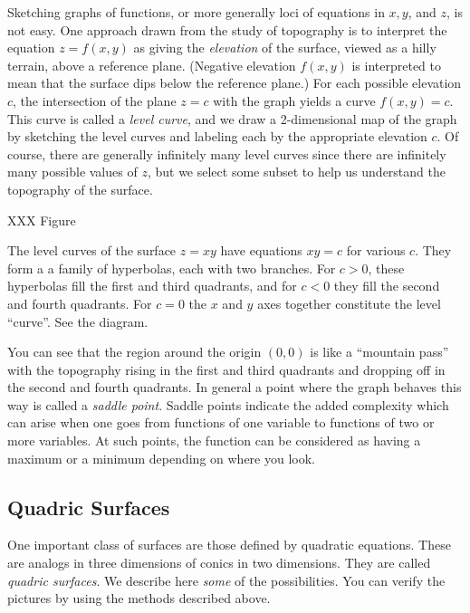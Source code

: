Sketching graphs of functions, or more generally loci of equations
in $x, y$, and $z$, is not easy.   One approach drawn from the
study of topography is to interpret the equation $z = f(x,y)$ as
giving the \emph{elevation} of the surface, viewed as a hilly
terrain, above a reference plane.  (Negative elevation
 $f(x,y)$ is
interpreted to mean that the surface dips below the reference plane.)
For each possible elevation $c$,
 the intersection of the plane $z = c$ with the graph
yields a curve $f(x,y) = c$.  This curve is called a \emph{level curve}, 
and we draw a 2-dimensional map of the graph by sketching
the level curves and labeling each by the appropriate elevation
$c$.  Of course, there are generally infinitely many level curves
since there are infinitely many possible values of $z$, but we
select some subset to help us understand the topography of the
surface.

XXX Figure

\begin{example}
	The level curves of the surface $z = xy$ have equations
	$xy = c$ for various $c$.  They form a 
	a family of hyperbolas, each with two branches.  For $c > 0$,
	these hyperbolas fill the first and third quadrants, and for
	$c < 0$ they fill the second and fourth quadrants.  For $c  = 0$
	the $x$ and $y$ axes together constitute the level ``curve''.
	See the diagram.

	You can see that the region around the origin $(0,0)$ is like a
	``mountain pass'' with the topography rising in the first and
	third quadrants and dropping off in the second and fourth quadrants.
	In general a point where the graph behaves this way is called
	a \emph{saddle point}.   Saddle points indicate the added complexity
	which can arise when one goes from functions of one variable to
	functions of two or more variables.  At such points, the function
	can be considered as having a maximum  or
	 a minimum depending on where you
	look.
\end{example}

\subsection{Quadric Surfaces}
One important class of surfaces are those defined by quad\-rat\-ic
equations.  These are analogs in three dimensions of
conics in two dimensions.  They are called \emph{quadric surfaces}.  
We describe here \emph{some} of the possibilities.
You can verify the pictures by using the methods described above.

